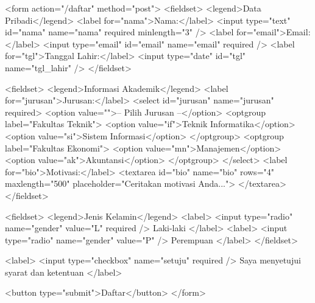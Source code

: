 \begin{webcode}[language=HTML, caption={Form pendaftaran dengan fieldset, select, dan validasi}]
<form action="/daftar" method="post">
  <fieldset>
    <legend>Data Pribadi</legend>
    <label for="nama">Nama:</label>
    <input type="text" id="nama" name="nama"
           required minlength="3" />
    <label for="email">Email:</label>
    <input type="email" id="email" name="email" required />
    <label for="tgl">Tanggal Lahir:</label>
    <input type="date" id="tgl" name="tgl_lahir" />
  </fieldset>

  <fieldset>
    <legend>Informasi Akademik</legend>
    <label for="jurusan">Jurusan:</label>
    <select id="jurusan" name="jurusan" required>
      <option value="">-- Pilih Jurusan --</option>
      <optgroup label="Fakultas Teknik">
        <option value="if">Teknik Informatika</option>
        <option value="si">Sistem Informasi</option>
      </optgroup>
      <optgroup label="Fakultas Ekonomi">
        <option value="mn">Manajemen</option>
        <option value="ak">Akuntansi</option>
      </optgroup>
    </select>
    <label for="bio">Motivasi:</label>
    <textarea id="bio" name="bio" rows="4"
              maxlength="500"
              placeholder="Ceritakan motivasi Anda...">
    </textarea>
  </fieldset>

  <fieldset>
    <legend>Jenis Kelamin</legend>
    <label>
      <input type="radio" name="gender" value="L" required />
      Laki-laki
    </label>
    <label>
      <input type="radio" name="gender" value="P" />
      Perempuan
    </label>
  </fieldset>

  <label>
    <input type="checkbox" name="setuju" required />
    Saya menyetujui syarat dan ketentuan
  </label>

  <button type="submit">Daftar</button>
</form>
\end{webcode}

